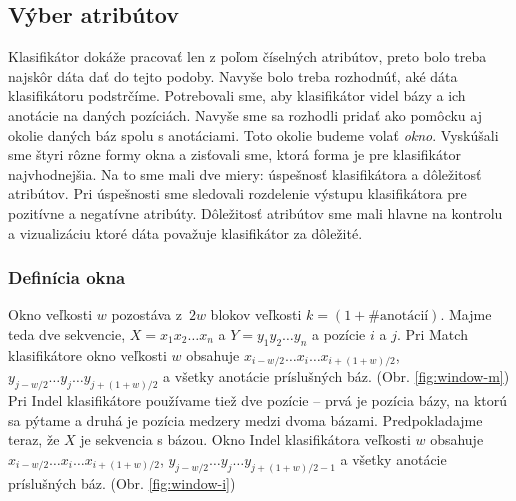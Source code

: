 \subsection{Výber atribútov}

Klasifikátor dokáže pracovať len z poľom číselných atribútov, preto bolo treba najskôr dáta dať do tejto podoby. Navyše bolo treba rozhodnúť, aké dáta klasifikátoru podstrčíme. Potrebovali sme, aby klasifikátor videl bázy a ich anotácie na daných pozíciách. Navyše sme sa rozhodli pridať ako pomôcku aj okolie daných báz spolu s anotáciami. Toto okolie budeme volať \textit{okno}. Vyskúšali sme štyri rôzne formy okna a zisťovali sme, ktorá forma je pre klasifikátor najvhodnejšia. Na to sme mali dve miery: úspešnosť klasifikátora a dôležitosť atribútov. Pri úspešnosti sme sledovali rozdelenie výstupu klasifikátora pre pozitívne a negatívne atribúty. Dôležitosť atribútov sme mali hlavne na kontrolu a vizualizáciu ktoré dáta považuje klasifikátor za dôležité.

\subsubsection{Definícia okna}
Okno veľkosti $w$ pozostáva z~$2w$ blokov veľkosti $k = (1+\#\text{anotácií})$.
Majme teda dve sekvencie, $X = x_1 x_2 \dots x_n$ a $Y = y_1 y_2 \dots y_n$ a pozície $i$ a $j$.
Pri Match klasifikátore okno veľkosti $w$ obsahuje $x_{i - w/2}\dots x_i \dots x_{i + (1 + w)/2}$, $y_{j - w/2}\dots y_j \dots y_{j + (1 + w)/2}$ a všetky anotácie príslušných báz. (Obr. \ref{fig:window-m})
Pri Indel klasifikátore používame tiež dve pozície -- prvá je pozícia bázy, na ktorú sa pýtame a druhá je pozícia medzery medzi dvoma bázami.
Predpokladajme teraz, že $X$ je sekvencia s bázou. Okno Indel klasifikátora veľkosti $w$ obsahuje $x_{i - w/2}\dots x_i \dots x_{i + (1 + w)/2}$, $y_{j - w/2}\dots y_j \dots y_{j + (1 + w)/2 - 1}$ a všetky anotácie príslušných báz. (Obr. \ref{fig:window-i})

